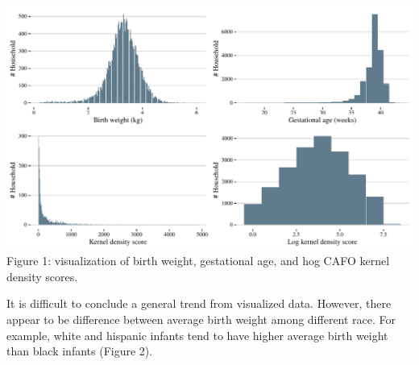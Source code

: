 \documentclass[
  12pt,
]{article}
\begin{document}
\includegraphics{ENV872_FINAL_CW_files/figure-latex/unnamed-chunk-5-1.pdf}
Figure 1: visualization of birth weight, gestational age, and hog CAFO
kernel density scores.

It is difficult to conclude a general trend from visualized data.
However, there appear to be difference between average birth weight
among different race. For example, white and hispanic infants tend to
have higher average birth weight than black infants (Figure 2).
\end{document}
